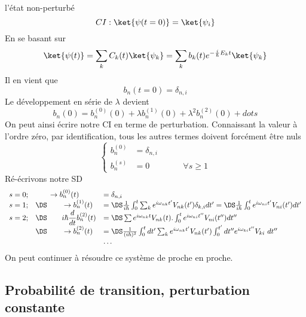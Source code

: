 		l'état non-perturbé
		\begin{equation}
		CI : \ket{\psi(t=0)} = \ket{\psi_i}
		\end{equation}
		En se basant sur
		\begin{equation}
		\ket{\psi(t)} = \sum_k C_k(t)\ket{\psi_k} = \sum_k b_k(t)e^{-\frac{i}{\hbar}E_kt}\ket{\psi_k}
		\end{equation}
		Il en vient que
		\begin{equation}
		b_n(t=0) = \delta_{n,i}
		\end{equation}
		Le développement en série de $\lambda$ devient
		\begin{equation}
		b_n(0) = b_n^{(0)}(0)+\lambda b_n^{(1)}(0)+\lambda^2b_n^{(2)}(0)+dots
		\end{equation}
		On peut ainsi écrire notre CI en terme de perturbation. Connaissant la valeur à l'ordre zéro, par 
		identification, tous les autres termes doivent forcément être nuls
		\begin{equation}
		\left\{\begin{array}{ll}
		b_n^{(0)} &= \delta_{n,i}\\
		b_n^{(s)} &= 0\qquad\qquad\forall s \geq 1
		\end{array}\right.
		\end{equation}
		Ré-écrivons notre SD
		\begin{equation}
		\begin{array}{lll}
		s=0; &\qquad \rightarrow b_n^{(0)}(t) &= \delta_{n,i}\\
		s=1; &\DS\qquad\rightarrow b_n^{(1)}(t) &=\DS \frac{1}{i\hbar}\int_0^t \sum_k e^{i\omega_{nk}t'}V_{nk}(t')\delta_{k,i}dt' =\DS 
		\frac{1}{i\hbar}\int_0^t e^{i\omega_{ni}t'}V_{ni}(t')dt'\\
		s=2; &\DS\qquad i\hbar\dfrac{d}{dt}b_n^{(2)}(t) &=\DS \sum e^{i\omega_{nk}t}V_{nk}(t).
		\int_0^t e^{i\omega_{ni}t''}V_{ni}(t'')dt''\\
		
		\phantom{s=2; }&\DS\qquad\rightarrow b_n^{(2)}(t) &=\DS \frac{1}{(i\hbar)^2}\int_0^t dt' \sum_k
		 e^{i\omega_{nk}t'} V_{nk}(t')\int_0^{t'} dt'' e^{i\omega_{ki}t''}V_{ki}\ dt''\\
		 &&\dots
		\end{array}
		\end{equation}
		On peut continuer à résoudre ce système de proche en proche.

	\subsection{Probabilité de transition, perturbation constante}
